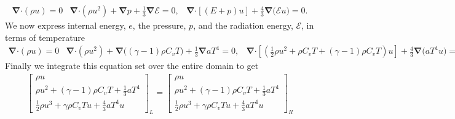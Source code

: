 \documentclass[10pt,letterpaper,notitlepage]{article}
\numberwithin{equation}{section}
\newcommand{\bnabla}{\boldsymbol{\nabla}}
\newcommand{\dotp}{\boldsymbol{\cdot}}
\newcommand{\RadE}{\mathcal{E}}
\newcommand{\half}{\frac{1}{2}}
\newcommand{\beqn}{\begin{equation}\begin{aligned}}
\newcommand{\eeqn}{\end{aligned}\end{equation}}
\begin{document}
\begin{appendices}
\begin{subequations}
	\beqn 
	\bnabla \dotp (\rho u) = 0
	\eeqn 
	\beqn 
	\bnabla \dotp ( \rho u^2 )  + \bnabla p 
	 +\frac{1}{3} \bnabla \RadE = 0,
	\eeqn 
	\beqn 
	\bnabla \dotp [(E + p)u] + \frac{4}{3} \bnabla \bigr( \RadE u  \bigr)
	= 0.
	\eeqn 
\end{subequations}
We now express internal energy, $e$, the pressure, $p$, and the radiation energy, $\RadE$, in terms of temperature
\begin{subequations}
	\beqn 
	\bnabla \dotp (\rho u) = 0
	\eeqn 
	\beqn 
	\bnabla \dotp ( \rho u^2 )  + \bnabla \bigr( (\gamma-1) \rho C_v T \bigr)
	+\frac{1}{3} \bnabla a T^4 = 0,
	\eeqn 
	\beqn 
	\bnabla \dotp [(\half \rho u^2 + \rho C_v T + (\gamma-1)\rho C_v T)u] + \frac{4}{3} \bnabla \bigr( aT^4 u  \bigr)
	= 0.
	\eeqn 
\end{subequations}
Finally we integrate this equation set over the entire domain to get
\begin{subequations}
	\beqn 
	\begin{bmatrix}
 		\rho u \\
		 \rho u^2   +  (\gamma-1) \rho C_v T 
		+\frac{1}{3} a T^4 \\
		\half \rho u^3 + \gamma \rho C_v T u  + \frac{4}{3} a T^4 u  
	\end{bmatrix}_L	
=
	\begin{bmatrix}
		\rho u \\
		\rho u^2   +  (\gamma-1) \rho C_v T 
		+\frac{1}{3} a T^4 \\
		\half \rho u^3 + \gamma \rho C_v T u + \frac{4}{3} a T^4 u  
	\end{bmatrix}_R
	\eeqn 
\end{subequations}


\end{appendices}
\end{document}
